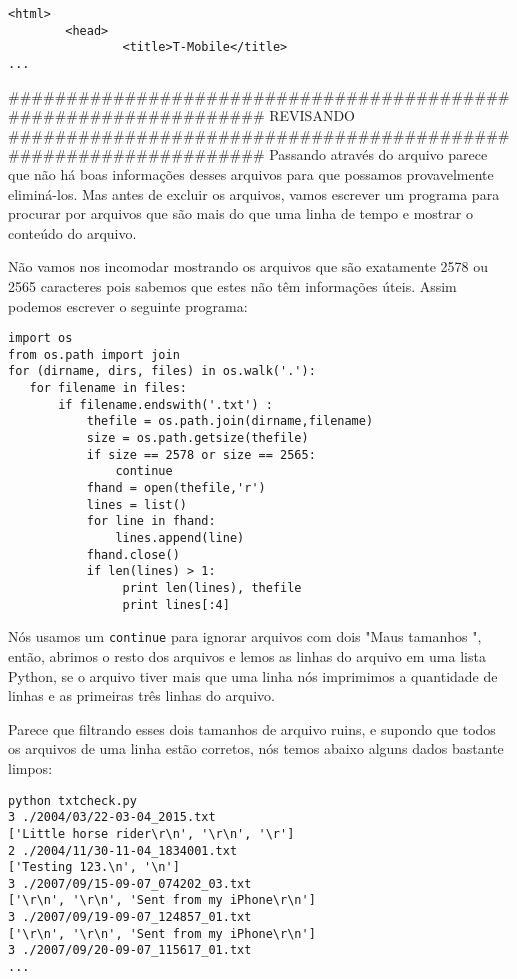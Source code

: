 \documentclass{book}
\begin{document}
\begin{verbatim}
<html>
        <head>
                <title>T-Mobile</title>
...
\end{verbatim}

%
#################################################################
	REVISANDO
#################################################################
Passando através do arquivo parece que não há boas informações desses arquivos para que possamos provavelmente eliminá-los. Mas antes de excluir os arquivos, vamos escrever um programa para procurar por arquivos que são mais do que uma linha de tempo e mostrar o conteúdo do arquivo. 

Não vamos nos incomodar mostrando os arquivos que são exatamente 2578 ou 2565 caracteres pois sabemos que estes não têm informações úteis. Assim podemos escrever o seguinte programa:

\begin{verbatim}
import os
from os.path import join
for (dirname, dirs, files) in os.walk('.'):
   for filename in files:
       if filename.endswith('.txt') :
           thefile = os.path.join(dirname,filename)
           size = os.path.getsize(thefile)
           if size == 2578 or size == 2565:
               continue
           fhand = open(thefile,'r')
           lines = list()
           for line in fhand:
               lines.append(line)
           fhand.close()
           if len(lines) > 1:
                print len(lines), thefile
                print lines[:4]
\end{verbatim}

%
Nós usamos um {\tt continue} para ignorar arquivos com dois "Maus tamanhos ", então, abrimos o resto dos arquivos e lemos as linhas do arquivo em uma lista Python, se o arquivo tiver mais que uma linha nós imprimimos a quantidade de linhas e as primeiras três linhas do arquivo.

Parece que filtrando esses dois tamanhos de arquivo ruins, e supondo
que todos os arquivos de uma linha estão corretos, nós temos abaixo alguns dados bastante limpos:

\begin{verbatim}
python txtcheck.py 
3 ./2004/03/22-03-04_2015.txt
['Little horse rider\r\n', '\r\n', '\r']
2 ./2004/11/30-11-04_1834001.txt
['Testing 123.\n', '\n']
3 ./2007/09/15-09-07_074202_03.txt
['\r\n', '\r\n', 'Sent from my iPhone\r\n']
3 ./2007/09/19-09-07_124857_01.txt
['\r\n', '\r\n', 'Sent from my iPhone\r\n']
3 ./2007/09/20-09-07_115617_01.txt
...
\end{verbatim}
%
\end{document}
